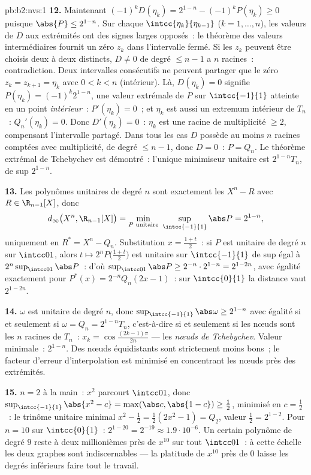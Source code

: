 \begin{solution}{pb:b2:nvs:1}
\textbf{12.} Maintenant $(-1)^kD(\eta_k) = 2^{1-n} - (-1)^kP(\eta_k)
\geq 0$ puisque $\abs{P} \leq 2^{1-n}$. Sur chaque
$\intcc{\eta_k}{\eta_{k-1}}$ ($k = 1, \dots, n$), les valeurs de $D$
aux extrémités ont des signes larges opposés~: le théorème des valeurs
intermédiaires fournit un zéro $z_k$ dans l'intervalle fermé. Si les $z_k$
peuvent être choisis deux à deux distincts, $D \neq 0$ de degré $\leq n-1$
a $n$ racines~: contradiction. Deux intervalles consécutifs ne peuvent
partager que le zéro $z_k = z_{k+1} = \eta_k$ avec $0 < k < n$
(intérieur). Là, $D(\eta_k) = 0$ signifie $P(\eta_k) =
(-1)^k2^{1-n}$, une valeur extrémale de $P$ sur $\intcc{-1}{1}$
atteinte en un point \emph{intérieur}~: $P'(\eta_k) = 0$~; et
$\eta_k$ est aussi un extremum intérieur de $T_n$~: $Q_n'(\eta_k) =
0$. Donc $D'(\eta_k) = 0$~: $\eta_k$ est une racine de multiplicité
$\geq 2$, compensant l'intervalle partagé. Dans tous les cas $D$ possède
au moins $n$ racines comptées avec multiplicité, de degré $\leq n -
1$, donc $D = 0$~: $P = Q_n$. Le théorème extrémal de Tchebychev est
démontré~: l'unique minimiseur unitaire est $2^{1-n}T_n$, de  sup
$2^{1-n}$.

\textbf{13.} Les polynômes unitaires de degré $n$ sont exactement les
$X^n - R$ avec $R \in \R_{n-1}[X]$, donc
\[
d_\infty\bigl(X^n, \R_{n-1}[X]\bigr) = \min_{P \text{
unitaire}}\ \sup_{\intcc{-1}{1}}\abs P = 2^{1-n},
\]
uniquement en $R^* = X^n - Q_n$. Substitution $x = \frac{1+t}2$~:
si $P$ est unitaire de degré $n$ sur $\intcc01$, alors $t \mapsto
2^nP\bigl(\frac{1+t}2\bigr)$ est unitaire sur $\intcc{-1}{1}$ de
sup égal à $2^n\sup_{\intcc01}\abs P$~: d'où
$\sup_{\intcc01}\abs P \geq 2^{-n}\cdot2^{1-n} = 2^{1-2n}$, avec
égalité exactement pour $P^*(x) = 2^{-n}Q_n(2x - 1)$~: sur
$\intcc{0}{1}$ la distance vaut $2^{1-2n}$.

\textbf{14.} $\omega$ est unitaire de degré $n$, donc
$\sup_{\intcc{-1}{1}}\abs\omega \geq 2^{1-n}$ avec égalité si et seulement si
$\omega = Q_n = 2^{1-n}T_n$, c'est-à-dire si et seulement si les nœuds sont les $n$
racines de $T_n$~: $x_k = \cos\frac{(2k-1)\pi}{2n}$ --- les
\emph{nœuds de Tchebychev}. Valeur minimale~: $2^{1-n}$. Des nœuds
équidistants sont strictement moins bons~; le facteur d'erreur
d'interpolation est minimisé en concentrant les nœuds près des
extrémités.

\textbf{15.} $n = 2$ à la main~: $x^2$ parcourt $\intcc01$, donc
$\sup_{\intcc{-1}{1}}\abs{x^2 - c} = \max(\abs c, \abs{1 - c})
\geq \frac12$, minimisé en $c = \frac12$~: le trinôme unitaire
minimal $x^2 - \frac12 = \frac12(2x^2 - 1) = Q_2$, valeur
$\frac12 = 2^{1-2}$. Pour $n = 10$ sur $\intcc{0}{1}$~: $2^{1-20} =
2^{-19} \approx 1.9\cdot10^{-6}$. Un certain polynôme de degré $9$
reste à deux millionièmes près de $x^{10}$ sur tout
$\intcc01$~: à cette échelle les deux graphes sont indiscernables
--- la platitude de $x^{10}$ près de $0$ laisse les degrés inférieurs
faire tout le travail.


\end{solution}
